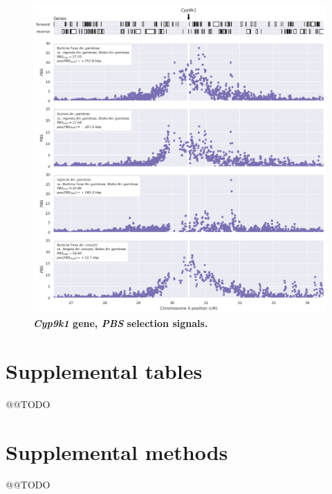 \documentclass[a4paper,11pt,abstracton,hidelinks]{scrartcl}
\begin{document}
\begin{figure}[t!]
	\begin{center}
		\includegraphics*[width=1.1\linewidth,center]{artwork/locus_cyp9k1_pbs.png}
	\end{center}
	\caption[\textit{Cyp9k1} gene, \textit{PBS} selection signals]{
	\textbf{\textit{Cyp9k1} gene, \textit{PBS} selection signals.}
	} 
	\label{fig:locus_cyp9k1_pbs}
\end{figure}


\clearpage

\section{Supplemental tables}

@@TODO


\clearpage


\section{Supplemental methods}

@@TODO


\printbibliography
\end{document}
